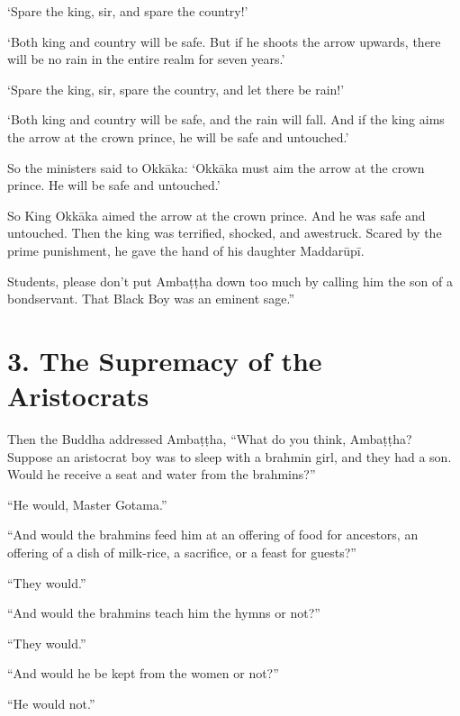 \documentclass[12pt,openany]{book}%
\begin{document}
‘Spare the king, sir, and spare the country!’ 

‘Both king and country will be safe. But if he shoots the arrow upwards, there will be no rain in the entire realm for seven years.’ 

‘Spare the king, sir, spare the country, and let there be rain!’ 

‘Both king and country will be safe, and the rain will fall. And if the king aims the arrow at the crown prince, he will be safe and untouched.’ 

So the ministers said to \textsanskrit{Okkāka}: ‘\textsanskrit{Okkāka} must aim the arrow at the crown prince. He will be safe and untouched.’ 

So King \textsanskrit{Okkāka} aimed the arrow at the crown prince. And he was safe and untouched. Then the king was terrified, shocked, and awestruck. Scared by the prime punishment, he gave the hand of his daughter \textsanskrit{Maddarūpī}. 

Students, please don’t put \textsanskrit{Ambaṭṭha} down too much by calling him the son of a bondservant. That Black Boy was an eminent sage.” 

\section*{3. The Supremacy of the Aristocrats }

Then the Buddha addressed \textsanskrit{Ambaṭṭha}, “What do you think, \textsanskrit{Ambaṭṭha}? Suppose an aristocrat boy was to sleep with a brahmin girl, and they had a son. Would he receive a seat and water from the brahmins?” 

“He would, Master Gotama.” 

“And would the brahmins feed him at an offering of food for ancestors, an offering of a dish of milk-rice, a sacrifice, or a feast for guests?” 

“They would.” 

“And would the brahmins teach him the hymns or not?” 

“They would.” 

“And would he be kept from the women or not?” 

“He would not.” 
\end{document}
